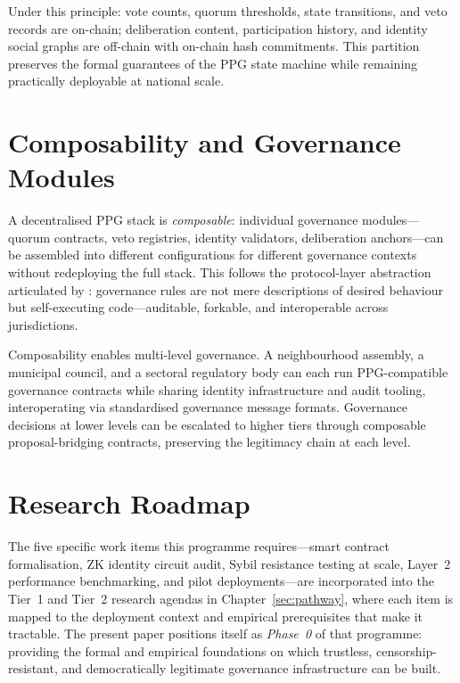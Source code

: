 \documentclass[12pt,a4paper,oneside]{report}
\begin{document}
Under this principle: vote counts, quorum thresholds, state transitions, and veto records are on-chain; deliberation content, participation history, and identity social graphs are off-chain with on-chain hash commitments. This partition preserves the formal guarantees of the PPG state machine while remaining practically deployable at national scale.

\section{Composability and Governance Modules}

A decentralised PPG stack is \emph{composable}: individual governance modules---quorum contracts, veto registries, identity validators, deliberation anchors---can be assembled into different configurations for different governance contexts without redeploying the full stack. This follows the protocol-layer abstraction articulated by \citet{defilippi2018blockchain}: governance rules are not mere descriptions of desired behaviour but self-executing code---auditable, forkable, and interoperable across jurisdictions.

Composability enables multi-level governance. A neighbourhood assembly, a municipal council, and a sectoral regulatory body can each run PPG-compatible governance contracts while sharing identity infrastructure and audit tooling, interoperating via standardised governance message formats. Governance decisions at lower levels can be escalated to higher tiers through composable proposal-bridging contracts, preserving the legitimacy chain at each level.

\section{Research Roadmap}

The five specific work items this programme requires---smart contract formalisation, ZK identity circuit audit, Sybil resistance testing at scale, Layer~2 performance benchmarking, and pilot deployments---are incorporated into the Tier~1 and Tier~2 research agendas in Chapter~\ref{sec:pathway}, where each item is mapped to the deployment context and empirical prerequisites that make it tractable. The present paper positions itself as \emph{Phase~0} of that programme: providing the formal and empirical foundations on which trustless, censorship-resistant, and democratically legitimate governance infrastructure can be built.

\end{document}
